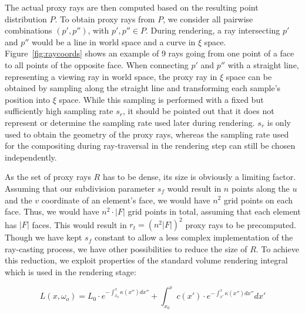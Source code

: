 \documentclass[journal]{vgtc}                %
\begin{document}
The actual proxy rays are then computed based on the resulting point distribution $P$. To obtain proxy rays from $P$, we consider all pairwise combinations $(p',p'')$, with $p',p'' \in P$. During rendering, a ray intersecting $p'$ and $p''$ would be a line in world space and a curve in $\xi$ space. Figure~\ref{fig:raycoords} shows an example of 9 rays going from one point of a face to all points of the opposite face. When connecting $p'$ and $p''$ with a straight line, representing a viewing ray in world space, the proxy ray in $\xi$ space can be obtained by sampling along the straight line and transforming each sample's position into $\xi$ space. While this sampling is performed with a fixed but sufficiently high sampling rate $s_r$, it should be pointed out that it does not represent or determine the sampling rate used later during rendering. $s_r$ is only used to obtain the geometry of the proxy rays, whereas the sampling rate used for the compositing during ray-traversal in the rendering step can still be chosen independently.

As the set of proxy rays $R$ has to be dense, its size is obviously a limiting factor. Assuming that our subdivision parameter $s_f$ would result in $n$ points along the $u$ and the $v$ coordinate of an element's face, we would have $n^2$ grid points on each face. Thus, we would have $n^2 \cdot \left|F\right|$ grid points in total, assuming that each element has $\left|F\right|$ faces. This would result in $r_t = (n^2 \left|F\right|)^2$ proxy rays to be precomputed. Though we have kept $s_f$ constant to allow a less complex implementation of the ray-casting process, we have other possibilities to reduce the size of $R$. To achieve this reduction, we exploit properties of the standard volume rendering integral which is used in the rendering stage:

$$ L(x,\omega_o) = L_0 \cdot e^{-\int_{x_0}^{x}\kappa(x'')dx''} + \int_{x_0}^{x}  \! c(x') \cdot e^{-\int_{x'}^{x}\kappa(x'')dx''} dx'$$
\end{document}
